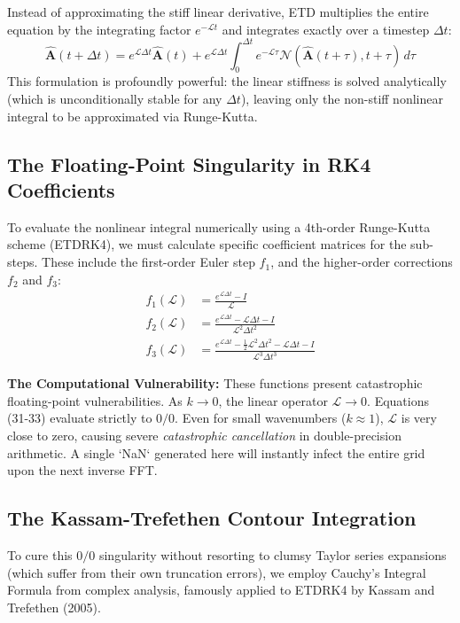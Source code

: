 \documentclass[11pt, a4paper]{article}
\begin{document}
Instead of approximating the stiff linear derivative, ETD multiplies the entire equation by the integrating factor $e^{-\mathcal{L}t}$ and integrates exactly over a timestep $\Delta t$:
\begin{equation}
    \hat{\mathbf{A}}(t + \Delta t) = e^{\mathcal{L}\Delta t}\hat{\mathbf{A}}(t) + e^{\mathcal{L}\Delta t} \int_0^{\Delta t} e^{-\mathcal{L}\tau} \mathcal{N}(\hat{\mathbf{A}}(t+\tau), t+\tau) \, d\tau
\end{equation}
This formulation is profoundly powerful: the linear stiffness is solved analytically (which is unconditionally stable for any $\Delta t$), leaving only the non-stiff nonlinear integral to be approximated via Runge-Kutta.

\subsection{The Floating-Point Singularity in RK4 Coefficients}
To evaluate the nonlinear integral numerically using a 4th-order Runge-Kutta scheme (ETDRK4), we must calculate specific coefficient matrices for the sub-steps. These include the first-order Euler step $f_1$, and the higher-order corrections $f_2$ and $f_3$:
\begin{align}
    f_1(\mathcal{L}) &= \frac{e^{\mathcal{L}\Delta t} - I}{\mathcal{L}} \\
    f_2(\mathcal{L}) &= \frac{e^{\mathcal{L}\Delta t} - \mathcal{L}\Delta t - I}{\mathcal{L}^2 \Delta t^2} \\
    f_3(\mathcal{L}) &= \frac{e^{\mathcal{L}\Delta t} - \frac{1}{2}\mathcal{L}^2 \Delta t^2 - \mathcal{L}\Delta t - I}{\mathcal{L}^3 \Delta t^3}
\end{align}

\textbf{The Computational Vulnerability:} These functions present catastrophic floating-point vulnerabilities. As $k \to 0$, the linear operator $\mathcal{L} \to 0$. Equations (31-33) evaluate strictly to $0/0$. Even for small wavenumbers ($k \approx 1$), $\mathcal{L}$ is very close to zero, causing severe \textit{catastrophic cancellation} in double-precision arithmetic. A single `NaN` generated here will instantly infect the entire grid upon the next inverse FFT.

\subsection{The Kassam-Trefethen Contour Integration}
To cure this $0/0$ singularity without resorting to clumsy Taylor series expansions (which suffer from their own truncation errors), we employ Cauchy's Integral Formula from complex analysis, famously applied to ETDRK4 by Kassam and Trefethen (2005).
\end{document}
